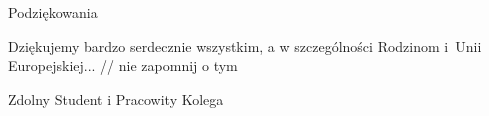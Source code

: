 \noindent
{\Large Podziękowania}
\bigskip

Dziękujemy bardzo serdecznie wszystkim, a w szczególności Rodzinom i~Unii Europejskiej... // nie zapomnij o tym 

\bigskip

{\raggedleft
Zdolny Student i Pracowity Kolega

}

